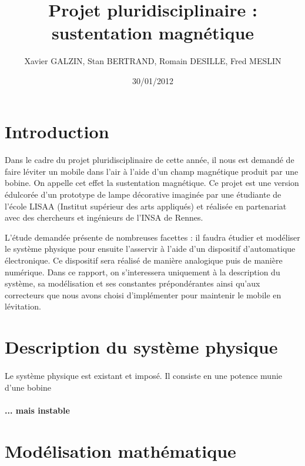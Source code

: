 \documentclass[11pt, french]{article} %
\title{Projet pluridisciplinaire : sustentation magnétique}
\author{ Xavier GALZIN, Stan BERTRAND, Romain DESILLE, Fred MESLIN}
\date{30/01/2012}
\begin{document}
\maketitle



\pagebreak

\section{Introduction}
\paragraph{}
	Dans le cadre du projet pluridisciplinaire de cette année, il nous est demandé de faire léviter un mobile dans l'air à l'aide d'un champ magnétique produit par une bobine. On appelle cet effet la sustentation magnétique. Ce projet est une version édulcorée d'un prototype de lampe décorative imaginée par une étudiante de l'école LISAA (Institut supérieur des arts appliqués) et réalisée en partenariat avec des chercheurs et ingénieurs de l'INSA de Rennes.

L'étude demandée présente de nombreuses facettes : il faudra étudier et modéliser le système physique pour ensuite l'asservir à l'aide d'un dispositif d'automatique électronique. Ce dispositif sera réalisé de manière analogique puis de manière numérique. Dans ce rapport, on s'interessera uniquement à la description du système, sa modélisation et ses constantes prépondérantes ainsi qu'aux correcteurs que nous avons choisi d'implémenter pour maintenir le mobile en lévitation.

\section{Description du système physique}
\paragraph{}
Le système physique est existant et imposé. Il consiste en une potence munie d'une bobine

\paragraph{... mais instable}

\section{Modélisation mathématique}
\end{document}
